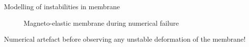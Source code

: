 \documentclass{beamer}
\begin{document}
\begin{frame}{Modelling of instabilities in membrane}
{\begin{figure}[h]
\caption{Magneto-elastic membrane during numerical failure}
\end{figure}
\begin{center}
\alert{Numerical artefact before observing any unstable deformation of the membrane!}
\end{center}
}%
\end{frame}
\end{document}
